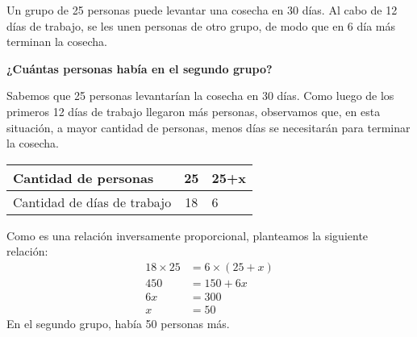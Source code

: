 \question[10] Un grupo de 25 personas puede levantar una cosecha en 30 días. Al cabo de 12 días de trabajo,
se les unen personas de otro grupo, de modo que en 6 día
más terminan la cosecha.

\textbf{¿Cuántas personas había en el segundo grupo?}


\begin{solutionbox}{8cm}
    Sabemos que 25 personas levantarían la cosecha en 30 días. Como luego de los primeros 12 días de trabajo llegaron más personas, observamos que, en esta situación, a mayor cantidad de personas, menos días se necesitarán para terminar la cosecha.
    \begin{table}[H]
        \centering
        \begin{tabular}{|l|c|l|}
            \hline
            Cantidad de personas        & 25 & 25+x \\
            \hline
            Cantidad de días de trabajo & 18 & 6    \\
            \hline
        \end{tabular}
    \end{table}
    Como es una relación inversamente proporcional, planteamos la siguiente relación:
    \begin{align*}
        18 \times 25 & = 6 \times (25+x) \\
        450          & = 150 +6x         \\
        6x           & = 300             \\
        x            & = 50
    \end{align*}
    En el segundo grupo, había 50 personas más.
\end{solutionbox}